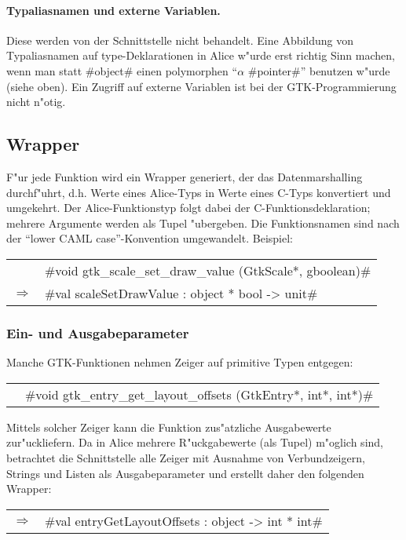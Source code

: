 \documentclass[a4paper,titlepage]{article}
\newcommand{\doparskip}{\bigskip}
\newcommand{\ra}{$\Longrightarrow$}
\begin{document}
\paragraph{Typaliasnamen und externe Variablen.}

Diese werden von
der Schnittstelle nicht behandelt. Eine Abbildung von Typaliasnamen auf
type-Deklarationen in Alice w"urde erst richtig Sinn machen, wenn man
statt #object# einen polymorphen ``$\alpha$ #pointer#'' benutzen w"urde
(siehe oben). Ein Zugriff auf externe Variablen
ist bei der GTK-Programmierung nicht n"otig.

\subsection{Wrapper}

F"ur jede Funktion wird ein Wrapper generiert, der das
Datenmarshalling durch\-f"uhrt, d.h. Werte eines Alice-Typs in Werte eines
C-Typs konvertiert und umgekehrt. Der Alice-Funktionstyp folgt dabei der
C-Funktionsdeklaration; mehrere Argumente werden als Tupel "ubergeben.
Die Funktionsnamen sind nach der ``lower CAML case''-Konvention
umgewandelt. Beispiel:\doparskip

\begin{tabular}{rl}
      & #void gtk_scale_set_draw_value (GtkScale*, gboolean)# \\
  \ra & #val scaleSetDrawValue : object * bool -> unit#
\end{tabular}

\subsubsection*{Ein- und Ausgabeparameter}

Manche GTK-Funktionen nehmen Zeiger auf primitive Typen entgegen:
\doparskip

\begin{tabular}{rl}
   & #void gtk_entry_get_layout_offsets (GtkEntry*, int*, int*)#
\end{tabular}
\doparskip

Mittels solcher Zeiger kann die Funktion zus"atzliche Ausgabewerte
zur"uckliefern. Da in Alice mehrere R"uckgabewerte (als Tupel) m"oglich sind,
betrachtet die Schnittstelle alle Zeiger mit Ausnahme von Verbundzeigern,
Strings und Listen als Ausgabeparameter und erstellt daher den folgenden
Wrapper:
\doparskip

\begin{tabular}{rl}
  \ra & #val entryGetLayoutOffsets : object -> int * int#
\end{tabular}
\doparskip
\end{document}
